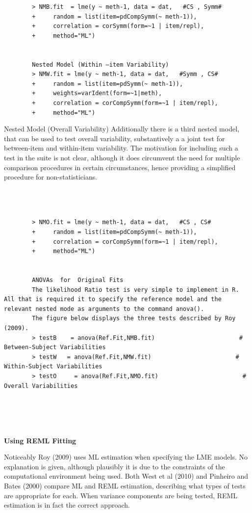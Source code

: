 \documentclass[12pt, a4paper]{report}
\theoremstyle{plain}
\theoremstyle{definition}
\theoremstyle{remark}
\begin{document}
\begin{framed}	\begin{verbatim}
		> NMB.fit  = lme(y ~ meth-1, data = dat,   #CS , Symm#
		+     random = list(item=pdCompSymm(~ meth-1)),
		+     correlation = corSymm(form=~1 | item/repl), 
		+     method="ML")
		
		
		Nested Model (Within –item Variability)
		> NMW.fit = lme(y ~ meth-1, data = dat,   #Symm , CS# 
		+     random = list(item=pdSymm(~ meth-1)),
		+     weights=varIdent(form=~1|meth), 
		+     correlation = corCompSymm(form=~1 | item/repl), 
		+     method="ML")
\end{verbatim}
\end{framed}
		
		Nested Model (Overall Variability)
		Additionally there is a third nested model, that can be used to test overall variability, substantively a a joint test for between-item and within-item variability. The motivation for including such a test in the suite is not clear, although it does circumvent the need for multiple comparison procedures in certain circumstances, hence providing a simplified procedure for non-statisticians.
\begin{framed}	\begin{verbatim}		
		
		

		> NMO.fit = lme(y ~ meth-1, data = dat,   #CS , CS# 
		+     random = list(item=pdCompSymm(~ meth-1)), 
		+     correlation = corCompSymm(form=~1 | item/repl), 
		+     method="ML")
		
		
		ANOVAs  for  Original Fits
		The likelihood Ratio test is very simple to implement in R. All that is required it to specify the reference model and the relevant nested mode as arguments to the command anova().
		The figure below displays the three tests described by Roy (2009).
		> testB    = anova(Ref.Fit,NMB.fit)                        # Between-Subject Variabilities
		> testW   = anova(Ref.Fit,NMW.fit)                        # Within-Subject Variabilities
		> testO     = anova(Ref.Fit,NMO.fit)                        # Overall Variabilities
		
		
		
		
		\end{verbatim}
	\end{framed}
	\newpage
	\noindent \textbf{Using REML Fitting}
	
	Noticeably Roy (2009) uses ML estimation when specifying the LME models. No explanation is given, although plausibly it is due to the constraints of the computational environment being used.
	Both West et al (2010) and Pinheiro and Bates (2000) compare ML and REML estimation, describing what types of tests are appropriate for each.  When variance components are being tested, REML estimation is in fact the correct approach.
	
\end{document}
